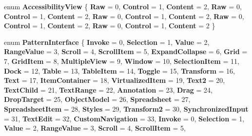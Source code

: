 \begin{DoxyCompactItemize}
enum {\bfseries Accessibility\+View} \{ \newline
{\bfseries Raw} = 0, 
{\bfseries Control} = 1, 
{\bfseries Content} = 2, 
{\bfseries Raw} = 0, 
\newline
{\bfseries Control} = 1, 
{\bfseries Content} = 2, 
{\bfseries Raw} = 0, 
{\bfseries Control} = 1, 
\newline
{\bfseries Content} = 2, 
{\bfseries Raw} = 0, 
{\bfseries Control} = 1, 
{\bfseries Content} = 2, 
\newline
{\bfseries Raw} = 0, 
{\bfseries Control} = 1, 
{\bfseries Content} = 2
 \}
\item 
\mbox{\label{namespace_windows_1_1_u_i_1_1_xaml_1_1_automation_1_1_peers_a4cd1632dc1195eae46e115d12298a6a7}} 
enum {\bfseries Pattern\+Interface} \{ \newline
{\bfseries Invoke} = 0, 
{\bfseries Selection} = 1, 
{\bfseries Value} = 2, 
{\bfseries Range\+Value} = 3, 
\newline
{\bfseries Scroll} = 4, 
{\bfseries Scroll\+Item} = 5, 
{\bfseries Expand\+Collapse} = 6, 
{\bfseries Grid} = 7, 
\newline
{\bfseries Grid\+Item} = 8, 
{\bfseries Multiple\+View} = 9, 
{\bfseries Window} = 10, 
{\bfseries Selection\+Item} = 11, 
\newline
{\bfseries Dock} = 12, 
{\bfseries Table} = 13, 
{\bfseries Table\+Item} = 14, 
{\bfseries Toggle} = 15, 
\newline
{\bfseries Transform} = 16, 
{\bfseries Text} = 17, 
{\bfseries Item\+Container} = 18, 
{\bfseries Virtualized\+Item} = 19, 
\newline
{\bfseries Text2} = 20, 
{\bfseries Text\+Child} = 21, 
{\bfseries Text\+Range} = 22, 
{\bfseries Annotation} = 23, 
\newline
{\bfseries Drag} = 24, 
{\bfseries Drop\+Target} = 25, 
{\bfseries Object\+Model} = 26, 
{\bfseries Spreadsheet} = 27, 
\newline
{\bfseries Spreadsheet\+Item} = 28, 
{\bfseries Styles} = 29, 
{\bfseries Transform2} = 30, 
{\bfseries Synchronized\+Input} = 31, 
\newline
{\bfseries Text\+Edit} = 32, 
{\bfseries Custom\+Navigation} = 33, 
{\bfseries Invoke} = 0, 
{\bfseries Selection} = 1, 
\newline
{\bfseries Value} = 2, 
{\bfseries Range\+Value} = 3, 
{\bfseries Scroll} = 4, 
{\bfseries Scroll\+Item} = 5, 
\newline

\end{DoxyCompactItemize}
